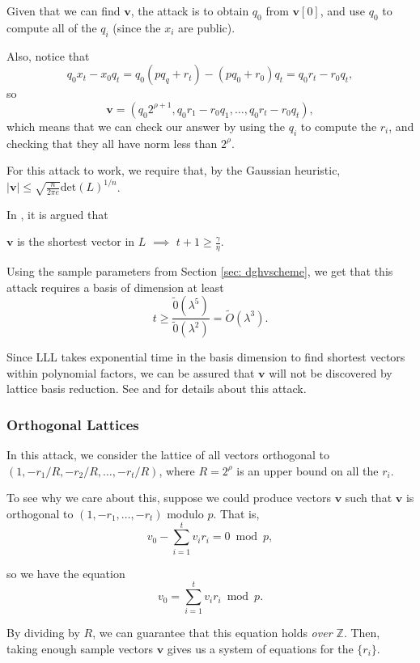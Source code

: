     Given that we can find $\mathbf{v}$, the attack is to obtain $q_0$ from $\mathbf{v}[0]$, and use $q_0$ to compute all of the $q_i$ (since the $x_i$ are public).

    Also, notice that
    \[q_0 x_t - x_0 q_t = q_0 (p q_q + r_t) - (p q_0 + r_0) q_t = q_0 r_t - r_0 q_t,\]
    so
    \[ \mathbf{v} = (q_0 2^{\rho + 1}, q_0 r_1 - r_0 q_1, \dots, q_0 r_t - r_0 q_t),\]
    which means that we can check our answer by using the $q_i$ to compute the $r_i$, and checking that they all have norm less than $2^{\rho}$.

    For this attack to work, we require that, by the Gaussian heuristic, $|\mathbf{v}| \leq \sqrt{\frac{n}{2 \pi e}}\text{det}(L)^{1 / n}$.

    In \cite{dghv}, it is argued that
    \begin{lemma}
        $\mathbf{v}$ is the shortest vector in $L$ $\implies$ $t + 1 \geq \frac{\gamma}{\eta}$.
    \end{lemma}

    Using the sample parameters from Section \ref{sec: dghvscheme}, we get that this attack requires a basis of dimension at least
    \[t \geq \frac{\widetilde{0}(\lambda^5)}{\widetilde{0}(\lambda^2)} = \widetilde{O}(\lambda^3).\]

    Since LLL takes exponential time in the basis dimension to find shortest vectors within polynomial factors, we can be assured that $\mathbf{v}$ will not be discovered by lattice basis reduction. See \cite{dghv} and \cite{galbraithalgorithms} for details about this attack.

    \subsubsection{Orthogonal Lattices}
        In this attack, we consider the lattice of all vectors orthogonal to $(1, -r_1 / R, -r_2 / R, \dots, -r_t / R)$, where $R = 2^\rho$ is an upper bound on all the $r_i$.

        To see why we care about this, suppose we could produce vectors $\mathbf{v}$ such that $\mathbf{v}$ is orthogonal to $(1, -r_1, \dots, -r_t)$ modulo $p$. That is,
        \[v_0 - \sum_{i = 1}^t v_i r_i = 0 \bmod p,\]

        so we have the equation
        \[v_0 = \sum_{i = 1}^t v_i r_i \bmod p.\]

        By dividing by $R$, we can guarantee that this equation holds \emph{over $\mathbb{Z}$}. Then, taking enough sample vectors $\mathbf{v}$ gives us a system of equations for the $\{r_i\}$.

